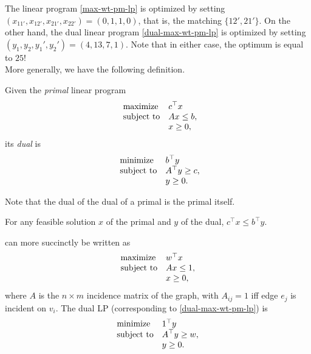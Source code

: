 	The linear program \eqref{max-wt-pm-lp} is optimized by setting $(x_{11'},x_{12'},x_{21'},x_{22'}) = (0,1,1,0)$, that is, the matching $\{12',21'\}$. On the other hand, the dual linear program \eqref{dual-max-wt-pm-lp} is optimized by setting $(y_1,y_2,y_1',y_2') = (4,13,7,1)$. Note that in either case, the optimum is equal to $25$! \\

	More generally, we have the following definition.

	\begin{fdef}
		\label{def:dual}
		Given the \emph{primal} linear program
		\[
		\begin{array}{ll@{}ll}
		\text{maximize}  & \displaystyle c^\top x \\
		\text{subject to} \displaystyle &Ax \le b,\\
		                  &x \ge 0,
		\end{array}
		\]
		its \emph{dual} is
		\[
		\begin{array}{ll@{}ll}
		\text{minimize}  & \displaystyle b^\top y \\
		\text{subject to} \displaystyle &A^\top y \ge c,\\
		                  &y \ge 0.
		\end{array}
		\]
	\end{fdef}

	Note that the dual of the dual of a primal is the primal itself.

	\begin{fprop}
		For any feasible solution $x$ of the primal and $y$ of the dual, $c^\top x \le b^\top y$.
	\end{fprop}



	 can more succinctly be written as
	\begin{equation}		
	\label{max-wt-pm-lp-2}
	\begin{array}{ll@{}ll}
	\text{maximize}  & w^\top x &\\
	\text{subject to}& \displaystyle Ax \le 1, &\\
	                 & x \ge 0,&
	\end{array}
	\end{equation}
	where $A$ is the $n \times m$ incidence matrix of the graph, with $A_{ij} = 1$ iff edge $e_j$ is incident on $v_i$. The dual LP (corresponding to \cref{dual-max-wt-pm-lp}) is
	\[
	\begin{array}{ll@{}ll}
	\text{minimize}  & 1^\top y &\\
	\text{subject to}& \displaystyle A^\top y \ge w, \\
	                 & y \ge 0.
	\end{array}
	\]

